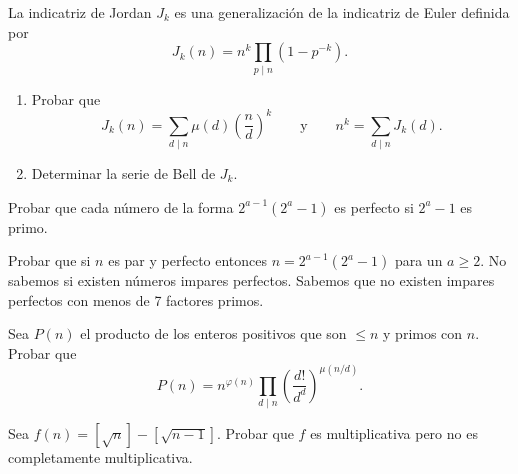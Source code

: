 \documentclass[12pt,a4paper]{book}
\begin{document}
    \begin{ejercicio}
        La indicatriz de Jordan $J_{k}$ es una generalización de la indicatriz de Euler
        definida por
        \begin{equation*}
            J_{k}(n)=n^{k}\prod_{p\mid n}(1-p^{-k}).
        \end{equation*}
        \begin{enumerate}
            \item[(a)] Probar que
            \begin{equation*}
                J_{k}(n)=\sum_{d\mid n}\mu(d)\left(\frac{n}{d}\right)^{k}\qquad\text{y}\qquad
                n^{k}=\sum_{d\mid n}J_{k}(d).
            \end{equation*}
            \item[(b)] Determinar la serie de Bell de $J_{k}$.
        \end{enumerate}
    \end{ejercicio}

    \begin{ejercicio}
        Probar que cada número de la forma $2^{a-1}(2^{a}-1)$ es perfecto si $2^{a}-1$ es
        primo.
    \end{ejercicio}

    \begin{ejercicio}
        Probar que si $n$ es par y perfecto entonces $n=2^{a-1}(2^{a}-1)$ para un $a\geq2$.
        No sabemos si existen números impares perfectos. Sabemos que no existen impares
        perfectos con menos de 7 factores primos.
    \end{ejercicio}

    \begin{ejercicio}
        Sea $P(n)$ el producto de los enteros positivos que son $\leq n$ y primos con $n$.
        Probar que
        \begin{equation*}
            P(n)=n^{\varphi(n)}\prod_{d\mid n}\left(\frac{d!}{d^{d}}\right)^{\mu(n/d)}.
        \end{equation*}
    \end{ejercicio}

    \begin{ejercicio}
        Sea $f(n)=[\sqrt{n}]-[\sqrt{n-1}]$. Probar que $f$ es multiplicativa pero no es
        completamente multiplicativa.
    \end{ejercicio}
\end{document}

